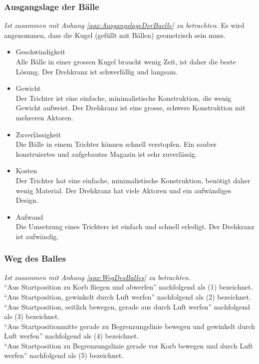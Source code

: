 		\subsubsection{Ausgangslage der Bälle}
			\textit{Ist zusammen mit Anhang \ref{apx:AusgangslageDerBaelle} zu betrachten.}
			Es wird angenommen, dass die Kugel (gefüllt mit Bällen) geometrisch sein muss.
			\begin{itemize}
				\item Geschwindigkeit\\
				Alle Bälle in einer grossen Kugel braucht wenig Zeit, ist daher die beste Lösung. Der Drehkranz ist schwerfällig und langsam.
				\item Gewicht\\
				Der Trichter ist eine einfache, minimalistische Konstruktion, die wenig Gewicht aufweist. Der Drehkranz ist eine grosse, schwere Konstruktion mit mehreren Aktoren.
				\item Zuverlässigkeit\\
				Die Bälle in einem Trichter können schnell verstopfen. Ein sauber konstruiertes und aufgebautes Magazin ist sehr zuverlässig. 
				\item Kosten\\
				Der Trichter hat eine einfache, minimalistische Konstruktion, benötigt daher wenig Material. Der Drehkranz hat viele Aktoren und ein aufwändiges Design.
				\item Aufwand\\
				Die Umsetzung eines Trichters ist einfach und schnell erledigt. Der Drehkranz ist aufwändig.					
			\end{itemize}
			
			
		\subsubsection{Weg des Balles}
		\textit{Ist zusammen mit Anhang \ref{apx:WegDesBalles} zu betrachten.}\\		
		\enquote{Aus Startposition zu Korb fliegen und abwerfen} nachfolgend als (1) bezeichnet.\\	
		\enquote{Aus Startposition, gewinkelt durch Luft werfen} nachfolgend als (2) bezeichnet.\\
		\enquote{Aus Startposition, seitlich bewegen, gerade aus durch Luft werfen} nachfolgend als (3) bezeichnet.\\
		\enquote{Aus Startpositionmitte gerade zu Begrenzungslinie bewegen und gewinkelt durch Luft werfen} nachfolgend als (4) bezeichnet.\\
		\enquote{Aus Startposition zu Begrenzungslinie gerade vor Korb bewegen und durch Luft werfen} nachfolgend als (5) bezeichnet.\\	
		
